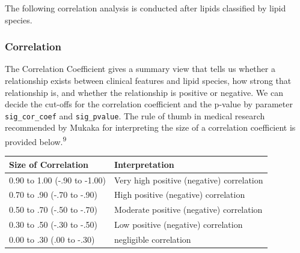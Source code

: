 \documentclass[]{article}
\begin{document}
The following correlation analysis is conducted after lipids classified by lipid species.

\hypertarget{correlation}{%
\subsubsection{Correlation}\label{correlation}}

The Correlation Coefficient gives a summary view that tells us whether a relationship exists between clinical features and lipid species, how strong that relationship is, and whether the relationship is positive or negative. We can decide the cut-offs for the correlation coefficient and the p-value by parameter \texttt{sig\_cor\_coef} and \texttt{sig\_pvalue}. The rule of thumb in medical research recommended by Mukaka for interpreting the size of a correlation coefficient is provided below.\textsuperscript{9}

\begin{longtable}[]{@{}ll@{}}
\toprule
Size of Correlation & Interpretation\tabularnewline
\midrule
\endhead
0.90 to 1.00 (-.90 to -1.00) & Very high positive (negative) correlation\tabularnewline
0.70 to .90 (-.70 to -.90) & High positive (negative) correlation\tabularnewline
0.50 to .70 (-.50 to -.70) & Moderate positive (negative) correlation\tabularnewline
0.30 to .50 (-.30 to -.50) & Low positive (negative) correlation\tabularnewline
0.00 to .30 (.00 to -.30) & negligible correlation\tabularnewline
\bottomrule
\end{longtable}
\end{document}
